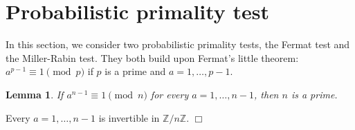 \documentclass{article}
\def\Z{{\mathbb Z}}
\def\Z{{\mathbb Z}}
\newtheorem{lemma}[subsection]{Lemma}
\newenvironment{proof}{\noindent {\bf Proof:}}{$\Box$ \vspace{2 ex}}
\begin{document}
\begin{comment}
A similar method can be used for the general discrete logarithm problem: given $M$, $C$ and $n$, find $d$ such that $M\equiv C^d\pmod{n}$. We use a two variable version of the above. 
\begin{enumerate}
    \item Compute $M^\alpha C^{-\beta}$ mod $n$ for all non-negative integers $\alpha,\beta < o_n(C)$ at the same time.

    We get a superposition of $|\alpha, \beta, M^\alpha C^{-\beta}\mbox{ mod }n\rangle.$ Measuring the third registry gives a random $c_0$ and superposition of states $|\alpha,\beta\rangle$ such that $M^\alpha C^{-\beta}\equiv c_0\pmod{n}.$ These pairs of integers $(\alpha,\beta)$ are of the form
    $$(\alpha_0,\beta_0), (\alpha_0 + 1, \beta_0 + d), (\alpha_0 + 2, \beta_0 + 2d), \ldots$$
    \item Apply QFT.
\end{enumerate}

\subsection*{Exercises}
\begin{enumerate}[\thesection .1]
    \item Prove that if $n$ is an odd prime power, then $x^2 \equiv 1\pmod{n}$ if and only if $x\equiv\pm1\pmod{n}$.
    \item Suppose $n = pq$ is a product of two distinct odd primes. Find the number of $b\in (\Z/n\Z)^\times$ such that $o_n(b)$ is odd or $b^{o_n(b)/2}\equiv -1\pmod{n}$.
\end{enumerate}
\end{comment}




\section{Probabilistic primality test}
In this section, we consider two probabilistic primality tests, the Fermat test and the Miller-Rabin test. They both build upon Fermat's little theorem: $a^{p-1}\equiv 1\pmod{p}$ if $p$ is a prime and $a = 1,\ldots,p-1$.

\begin{lemma}
    If $a^{n-1}\equiv 1\pmod{n}$ for every $a = 1,\ldots,n-1$, then $n$ is a prime.
\end{lemma}

\begin{proof}
    Every $a = 1,\ldots,n-1$ is invertible in $\Z/n\Z$.
\end{proof}
\end{document}

